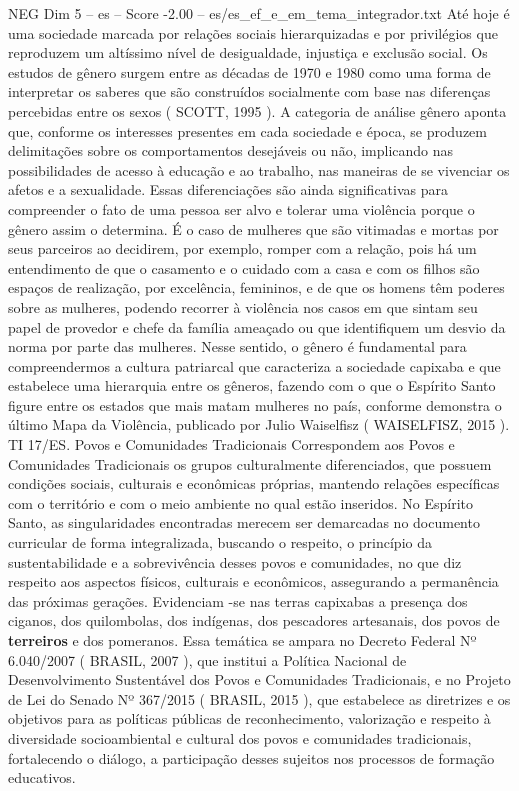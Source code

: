 \begin{textsample}{NEG Dim 5 – es – Score -2.00 – es/es\_ef\_e\_em\_tema\_integrador.txt}
Até hoje é uma sociedade marcada por relações sociais hierarquizadas e por privilégios que reproduzem um altíssimo nível de desigualdade, injustiça e exclusão social.
Os estudos de gênero surgem entre as décadas de 1970 e 1980 como uma forma de interpretar os saberes que são construídos socialmente com base nas diferenças percebidas entre os sexos ( SCOTT, 1995 ).
A categoria de análise gênero aponta que, conforme os interesses presentes em cada sociedade e época, se produzem delimitações sobre os comportamentos desejáveis ou não, implicando nas possibilidades de acesso à educação e ao trabalho, nas maneiras de se vivenciar os afetos e a sexualidade.
Essas diferenciações são ainda significativas para compreender o fato de uma pessoa ser alvo e tolerar uma violência porque o gênero assim o determina.
É o caso de mulheres que são vitimadas e mortas por seus parceiros ao decidirem, por exemplo, romper com a relação, pois há um entendimento de que o casamento e o cuidado com a casa e com os filhos são espaços de realização, por excelência, femininos, e de que os homens têm poderes sobre as mulheres, podendo recorrer à violência nos casos em que sintam seu papel de provedor e chefe da família ameaçado ou que identifiquem um desvio da norma por parte das mulheres.
Nesse sentido, o gênero é fundamental para compreendermos a cultura patriarcal que caracteriza a sociedade capixaba e que estabelece uma hierarquia entre os gêneros, fazendo com o que o Espírito Santo figure entre os estados que mais matam mulheres no país, conforme demonstra o último Mapa da Violência, publicado por Julio Waiselfisz ( WAISELFISZ, 2015 ).
TI 17/ES.
Povos e Comunidades Tradicionais Correspondem aos Povos e Comunidades Tradicionais os grupos culturalmente diferenciados, que possuem condições sociais, culturais e econômicas próprias, mantendo relações específicas com o território e com o meio ambiente no qual estão inseridos.
No Espírito Santo, as singularidades encontradas merecem ser demarcadas no documento curricular de forma integralizada, buscando o respeito, o princípio da sustentabilidade e a sobrevivência desses povos e comunidades, no que diz respeito aos aspectos físicos, culturais e econômicos, assegurando a permanência das próximas gerações.
Evidenciam -se nas terras capixabas a presença dos ciganos, dos quilombolas, dos indígenas, dos pescadores artesanais, dos povos de \textbf{terreiros} e dos pomeranos.
Essa temática se ampara no Decreto Federal Nº 6.040/2007 ( BRASIL, 2007 ), que institui a Política Nacional de Desenvolvimento Sustentável dos Povos e Comunidades Tradicionais, e no Projeto de Lei do Senado Nº 367/2015 ( BRASIL, 2015 ), que estabelece as diretrizes e os objetivos para as políticas públicas de reconhecimento, valorização e respeito à diversidade socioambiental e cultural dos povos e comunidades tradicionais, fortalecendo o diálogo, a participação desses sujeitos nos processos de formação educativos.

\end{textsample}
